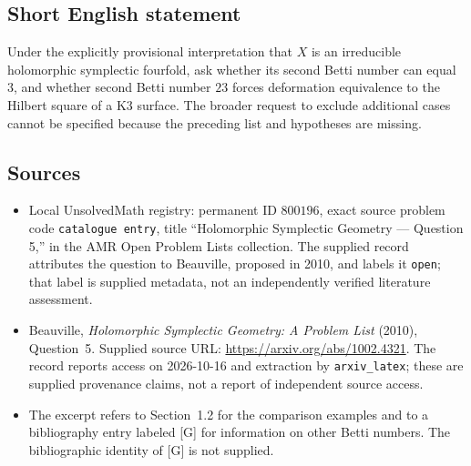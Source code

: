 \documentclass[11pt]{article}
\begin{document}
\subsection{Short English statement}
Under the explicitly provisional interpretation that \(X\) is an irreducible holomorphic symplectic fourfold, ask whether its second Betti number can equal \(3\), and whether second Betti number \(23\) forces deformation equivalence to the Hilbert square of a K3 surface. The broader request to exclude additional cases cannot be specified because the preceding list and hypotheses are missing.
\subsection{Sources}
\begin{itemize}
\item Local UnsolvedMath registry: permanent ID \(800196\), exact source problem code \texttt{catalogue entry}, title ``Holomorphic Symplectic Geometry --- Question 5,'' in the AMR Open Problem Lists collection. The supplied record attributes the question to Beauville, proposed in 2010, and labels it \texttt{open}; that label is supplied metadata, not an independently verified literature assessment.
\item Beauville, \emph{Holomorphic Symplectic Geometry: A Problem List} (2010), Question~5. Supplied source URL: \url{https://arxiv.org/abs/1002.4321}. The record reports access on 2026-10-16 and extraction by \texttt{arxiv\_latex}; these are supplied provenance claims, not a report of independent source access.
\item The excerpt refers to Section~1.2 for the comparison examples and to a bibliography entry labeled [G] for information on other Betti numbers. The bibliographic identity of [G] is not supplied.
\end{itemize}
\end{document}
